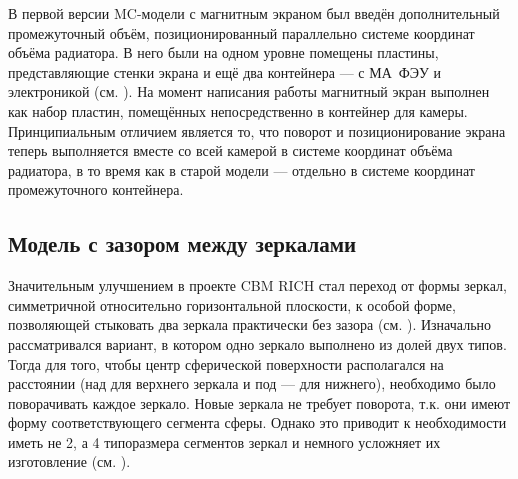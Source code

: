 В первой версии MC-модели с магнитным экраном был введён дополнительный промежуточный объём, позиционированный параллельно системе координат объёма радиатора. В него были на одном уровне помещены пластины, представляющие стенки экрана и ещё два контейнера --- с МА~ФЭУ и электроникой (см. ). На момент написания работы магнитный экран выполнен как набор пластин, помещённых непосредственно в контейнер для камеры. Принципиальным отличием является то, что поворот и позиционирование экрана теперь выполняется вместе со всей камерой в системе координат объёма радиатора, в то время как в старой модели --- отдельно в системе координат промежуточного контейнера.

\subsection{Модель с зазором между зеркалами}\label{sec:secMirrorsEvolution}

Значительным улучшением в проекте CBM RICH стал переход от формы зеркал, симметричной относительно горизонтальной плоскости, к особой форме, позволяющей стыковать два зеркала практически без зазора (см. ). Изначально рассматривался вариант, в котором одно зеркало выполнено из долей двух типов. Тогда для того, чтобы центр сферической поверхности располагался на расстоянии (над для верхнего зеркала и под --- для нижнего), необходимо было поворачивать каждое зеркало. Новые зеркала не требует поворота, т.к. они имеют форму соответствующего сегмента сферы. Однако это приводит к необходимости иметь не 2, а 4 типоразмера сегментов зеркал и немного усложняет их изготовление (см. ).

